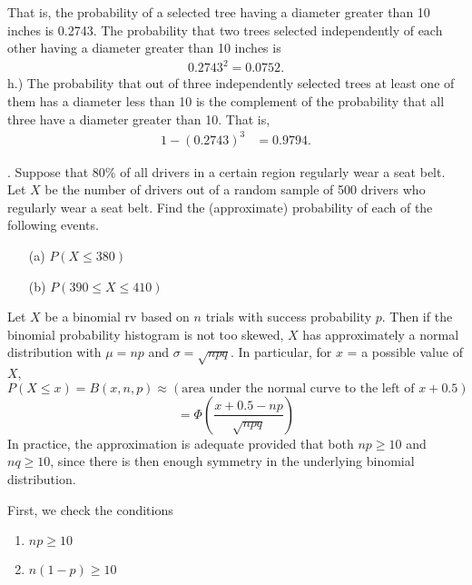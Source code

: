 \documentclass{report}
\begin{document}
 \bigbreak \noindent 
 That is, the probability of a selected tree having a diameter greater than 10 inches is 0.2743. The probability that two trees selected independently of each other having a diameter greater than 10 inches is 
 \begin{align*}
     0.2743^{2} = 0.0752
 .\end{align*}
 \bigbreak \noindent 
 h.) The probability that out of three independently selected trees at least one of them has a diameter less than 10 is the complement of the probability that all three have a diameter greater than 10. That is, 
 \begin{align*}
     1-(0.2743)^{3} &= 0.9794
 .\end{align*}

 \pagebreak \bigbreak \noindent 
 \begin{mdframed}
. Suppose that 80\% of all drivers in a certain region regularly wear a seat belt. Let \(X\) be the number of drivers out of a random sample of 500 drivers who regularly wear a seat belt. Find the (approximate) probability of each of the following events.
\begin{itemize}
    \item[(a)] \(P(X \leq 380)\)
    \item[(b)] \(P(390 \leq X \leq 410)\)
\end{itemize}
\end{mdframed}
\bigbreak \noindent 
\begin{remark}
    Let \( X \) be a binomial rv based on \( n \) trials with success probability \( p \). Then if the binomial probability histogram is not too skewed, \( X \) has approximately a normal distribution with \( \mu = np \) and \( \sigma = \sqrt{npq} \). In particular, for \( x \) = a possible value of \( X \),
    \[
        P(X \leq x) = B(x, n, p) \approx \left( \text{area under the normal curve to the left of } x + 0.5 \right)
    \]
    \[
        = \Phi \left( \frac{x + 0.5 - np}{\sqrt{npq}} \right)
    \]
    In practice, the approximation is adequate provided that both \( np \geq 10 \) and \( nq \geq 10 \), since there is then enough symmetry in the underlying binomial distribution.
    \smiley{}
\end{remark}
\bigbreak \noindent 
First, we check the conditions
\begin{enumerate}
    \item $np \geq 10 $
    \item $n(1-p) \geq 10 $
\end{enumerate}
\end{document}
